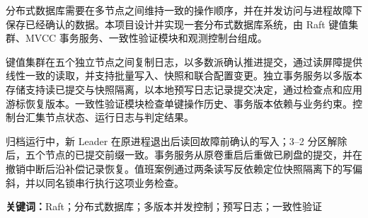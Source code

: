 \thispagestyle{empty}
分布式数据库需要在多节点之间维持一致的操作顺序，并在并发访问与进程故障下保存已经确认的数据。本项目设计并实现一套分布式数据库系统，由 Raft 键值集群、MVCC 事务服务、一致性验证模块和观测控制台组成。

键值集群在五个独立节点之间复制日志，以多数派确认推进提交，通过读屏障提供线性一致的读取，并支持批量写入、快照和联合配置变更。独立事务服务以多版本存储支持读已提交与快照隔离，以本地预写日志记录提交决定，通过检查点和应用游标恢复版本。一致性验证模块检查单键操作历史、事务版本依赖与业务约束。控制台汇集节点状态、运行日志与判定结果。

归档运行中，新 Leader 在原进程退出后读回故障前确认的写入；3–2 分区解除后，五个节点的已提交前缀一致。事务服务从原卷重启后重做已刷盘的提交，并在撤销中断后沿补偿记录恢复。值班案例通过两条读写反依赖定位快照隔离下的写偏斜，并以同名锁串行执行这项业务检查。

\vspace{0.8cm}
\noindent\textbf{关键词：}Raft；分布式数据库；多版本并发控制；预写日志；一致性验证
